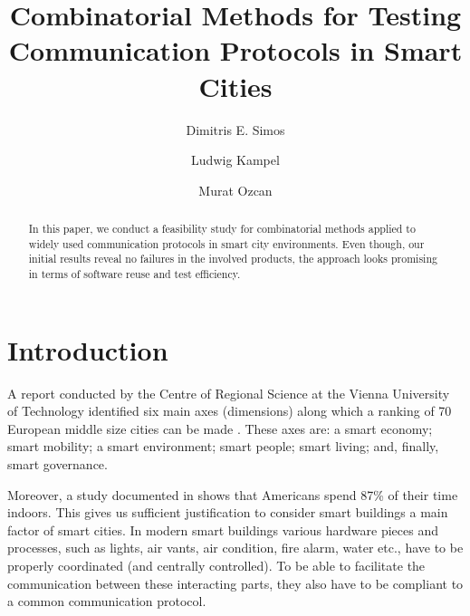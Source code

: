 \documentclass[runningheads]{llncs}
\begin{document}
\title{Combinatorial Methods for Testing Communication Protocols in Smart Cities}


\author{Dimitris E. Simos \and Ludwig Kampel \and Murat Ozcan}




\maketitle

\begin{abstract}
In this paper, we conduct a feasibility study for combinatorial methods applied to widely used communication protocols in smart city environments.
Even though, our initial results reveal no failures in the involved products,
the approach looks promising in terms of software reuse and test efficiency.



\end{abstract}

\section{Introduction}

A report conducted by the Centre of Regional Science
at the Vienna University of Technology identified six main axes (dimensions) along which a ranking of 70 European middle size cities can be made \cite{TUW}.
These axes are: a smart economy; smart mobility; a smart environment; smart people; smart living; and, finally, smart governance.

Moreover, a study documented in \cite{InDoorHours} shows that Americans spend 87\% of their time indoors.
This gives us sufficient justification to consider smart buildings a main factor of smart cities.
In modern smart buildings various hardware pieces and processes, such as lights, air vants, air condition, fire alarm, water etc.,
have to be properly coordinated (and centrally controlled). To be able to facilitate the communication between these interacting parts,
they also have to be compliant to a common communication protocol.
\end{document}
